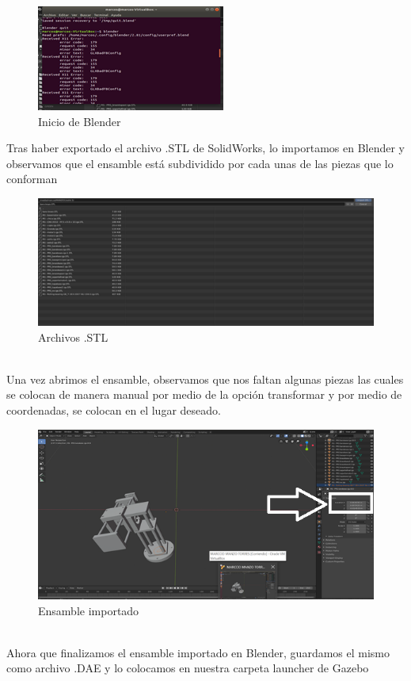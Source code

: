 \documentclass[11pt,a4paper,oldfontcommands,oneside]{memoir}
\begin{document}
\begin{figure}[h]
\includegraphics[scale=1.9]{2.png}	\caption{Inicio de Blender}
\label{Imagen 3}
\end{figure}
Tras haber exportado el archivo .STL de SolidWorks, lo importamos en Blender y observamos que el ensamble está subdividido por cada unas de las piezas que lo conforman
\begin{figure}[h]
\includegraphics[scale=1.7]{3.png}
\caption{Archivos .STL}
\label{Imagen 4}
\end{figure}\\
Una vez abrimos el ensamble, observamos que nos faltan algunas piezas las cuales se colocan de manera manual por medio de la opción transformar y por medio de coordenadas, se colocan en el lugar deseado.
\begin{figure}[h]
	\includegraphics[scale=1.2]{4.png}
	\caption{Ensamble importado}
	\label{Imagen 4}
\end{figure}\\
Ahora que finalizamos el ensamble importado en Blender, guardamos el mismo como archivo .DAE y lo colocamos en nuestra carpeta launcher de Gazebo
\end{document}
